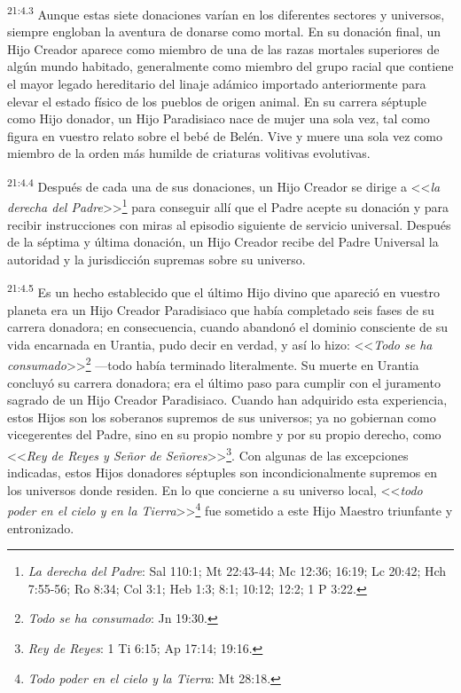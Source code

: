 \par
\textsuperscript{21:4.3} Aunque estas siete donaciones varían en los diferentes sectores y universos, siempre engloban la aventura de donarse como mortal. En su donación final, un Hijo Creador aparece como miembro de una de las razas mortales superiores de algún mundo habitado, generalmente como miembro del grupo racial que contiene el mayor legado hereditario del linaje adámico importado anteriormente para elevar el estado físico de los pueblos de origen animal. En su carrera séptuple como Hijo donador, un Hijo Paradisiaco nace de mujer una sola vez, tal como figura en vuestro relato sobre el bebé de Belén. Vive y muere una sola vez como miembro de la orden más humilde de criaturas volitivas evolutivas.

\par
\textsuperscript{21:4.4} Después de cada una de sus donaciones, un Hijo Creador se dirige a <<\textit{la derecha del Padre}>>\footnote{\textit{La derecha del Padre}: Sal 110:1; Mt 22:43-44; Mc 12:36; 16:19; Lc 20:42; Hch 7:55-56; Ro 8:34; Col 3:1; Heb 1:3; 8:1; 10:12; 12:2; 1 P 3:22.} para conseguir allí que el Padre acepte su donación y para recibir instrucciones con miras al episodio siguiente de servicio universal. Después de la séptima y última donación, un Hijo Creador recibe del Padre Universal la autoridad y la jurisdicción supremas sobre su universo.

\par
\textsuperscript{21:4.5} Es un hecho establecido que el último Hijo divino que apareció en vuestro planeta era un Hijo Creador Paradisiaco que había completado seis fases de su carrera donadora; en consecuencia, cuando abandonó el dominio consciente de su vida encarnada en Urantia, pudo decir en verdad, y así lo hizo: <<\textit{Todo se ha consumado}>>\footnote{\textit{Todo se ha consumado}: Jn 19:30.} ---todo había terminado literalmente. Su muerte en Urantia concluyó su carrera donadora; era el último paso para cumplir con el juramento sagrado de un Hijo Creador Paradisiaco. Cuando han adquirido esta experiencia, estos Hijos son los soberanos supremos de sus universos; ya no gobiernan como vicegerentes del Padre, sino en su propio nombre y por su propio derecho, como <<\textit{Rey de Reyes y Señor de Señores}>>\footnote{\textit{Rey de Reyes}: 1 Ti 6:15; Ap 17:14; 19:16.}. Con algunas de las excepciones indicadas, estos Hijos donadores séptuples son incondicionalmente supremos en los universos donde residen. En lo que concierne a su universo local, <<\textit{todo poder en el cielo y en la Tierra}>>\footnote{\textit{Todo poder en el cielo y la Tierra}: Mt 28:18.} fue sometido a este Hijo Maestro triunfante y entronizado.

